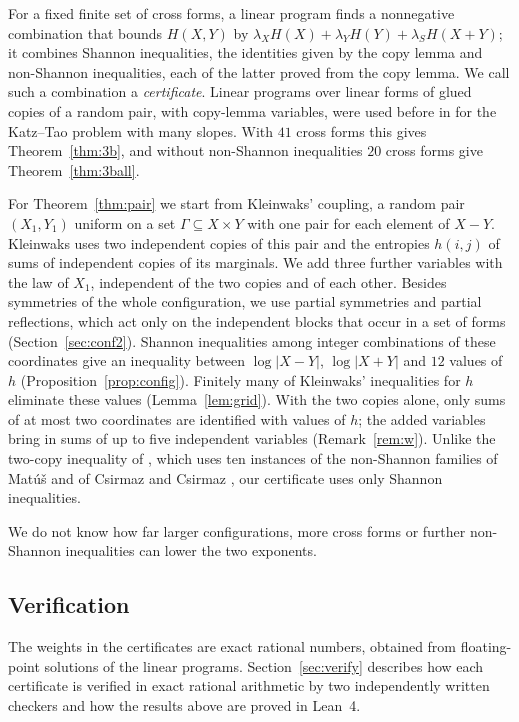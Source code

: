 \documentclass[11pt]{amsart}
\theoremstyle{definition}
\theoremstyle{remark}
\numberwithin{equation}{section}
\newcommand{\CbFormsUsed}{41}
\newcommand{\CgFormsUsed}{20}
\newcommand{\LmWadd}{three further variables with the law of $X_1$}
\newcommand{\LmHcount}{12}
\begin{document}
For a fixed finite set of cross forms, a linear program finds a nonnegative combination that bounds $H(X,Y)$ by $\lambda_XH(X)+\lambda_YH(Y)+\lambda_SH(X+Y)$; it combines Shannon inequalities, the identities given by the copy lemma and non-Shannon inequalities, each of the latter proved from the copy lemma. We call such a combination a \emph{certificate}. Linear programs over linear forms of glued copies of a random pair, with copy-lemma variables, were used before in \cite{MI26L} for the Katz--Tao problem with many slopes. With $\CbFormsUsed$ cross forms this gives Theorem~\ref{thm:3b}, and without non-Shannon inequalities $\CgFormsUsed$ cross forms give Theorem~\ref{thm:3ball}.

For Theorem~\ref{thm:pair} we start from Kleinwaks' coupling, a random pair $(X_1,Y_1)$ uniform on a set $\Gamma\subseteq X\times Y$ with one pair for each element of $X-Y$. Kleinwaks uses two independent copies of this pair and the entropies $h(i,j)$ of sums of independent copies of its marginals. We add \LmWadd, independent of the two copies and of each other. Besides symmetries of the whole configuration, we use partial symmetries and partial reflections, which act only on the independent blocks that occur in a set of forms (Section~\ref{sec:conf2}). Shannon inequalities among integer combinations of these coordinates give an inequality between $\log|X-Y|$, $\log|X+Y|$ and $\LmHcount$ values of $h$ (Proposition~\ref{prop:config}). Finitely many of Kleinwaks' inequalities for $h$ eliminate these values (Lemma~\ref{lem:grid}). With the two copies alone, only sums of at most two coordinates are identified with values of $h$; the added variables bring in sums of up to five independent variables (Remark~\ref{rem:w}). Unlike the two-copy inequality of \cite[Proposition~5.1]{Kle26}, which uses ten instances of the non-Shannon families of Mat\'u\v{s} \cite{Mat07} and of Csirmaz and Csirmaz \cite{CC26}, our certificate uses only Shannon inequalities.

We do not know how far larger configurations, more cross forms or further non-Shannon inequalities can lower the two exponents.

\subsection*{Verification}
The weights in the certificates are exact rational numbers, obtained from floating-point solutions of the linear programs. Section~\ref{sec:verify} describes how each certificate is verified in exact rational arithmetic by two independently written checkers and how the results above are proved in Lean~4.
\end{document}
